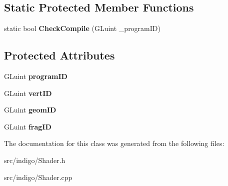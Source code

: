 \subsection*{Static Protected Member Functions}
\begin{DoxyCompactItemize}
\item 
\mbox{\label{class_indigo_1_1_shader_a7176b98040bdee7b5e518ad2659d4680}} 
static bool {\bfseries Check\+Compile} (G\+Luint \+\_\+program\+ID)
\end{DoxyCompactItemize}
\subsection*{Protected Attributes}
\begin{DoxyCompactItemize}
\item 
\mbox{\label{class_indigo_1_1_shader_ad448c26cdd5ca4da70ad5567b7dc51b0}} 
G\+Luint {\bfseries program\+ID}
\item 
\mbox{\label{class_indigo_1_1_shader_a9bafec6d1d3f1421eb7da289dec5da22}} 
G\+Luint {\bfseries vert\+ID}
\item 
\mbox{\label{class_indigo_1_1_shader_a13de64bdbcf3eb519a56e538effb16b9}} 
G\+Luint {\bfseries geom\+ID}
\item 
\mbox{\label{class_indigo_1_1_shader_aa2a0d55b9045f923969de9dabb711f64}} 
G\+Luint {\bfseries frag\+ID}
\end{DoxyCompactItemize}


The documentation for this class was generated from the following files\+:\begin{DoxyCompactItemize}
\item 
src/indigo/Shader.\+h\item 
src/indigo/Shader.\+cpp\end{DoxyCompactItemize}
